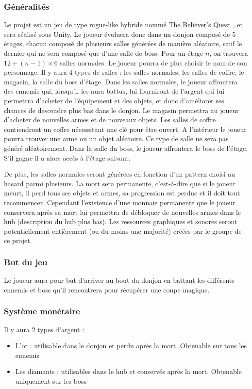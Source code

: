 \documentclass[]{extarticle}
\begin{document}
		\subsubsection{Généralités}
\bigbreak
\bigbreak
Le projet est un jeu de type rogue-like hybride nommé \og The Believer’s Quest \fg, et sera réalisé sous Unity. Le joueur évoluera donc dans un donjon composé de 5 étages, chacun composé de plusieurs salles générées de manière aléatoire, sauf le dernier qui ne sera composé que d’une salle de boss. Pour un étage $n$, on trouvera $12 + (n - 1) \times 6$ salles normales. Le joueur pourra de plus choisir le nom de son personnage.
\bigbreak
Il y aura 4 types de salles : les salles normales, les salles de coffre, le magasin, la salle du boss d’étage. Dans les salles normales, le joueur affrontera des ennemis qui, lorsqu’il les aura battus, lui fourniront de l’argent qui lui permettra d’acheter de l’équipement et des objets, et donc d’améliorer ses chances de descendre plus bas dans le donjon. Le magasin permettra au joueur d’acheter de nouvelles armes et de nouveaux objets. Les salles de coffre contiendront un coffre nécessitant une clé pour être ouvert. A l’intérieur le joueur pourra trouver une arme ou un objet aléatoire. Ce type de salle ne sera pas généré aléatoirement. Dans la salle du boss, le joueur affrontera le boss de l’étage. S’il gagne il a alors accès à l’étage suivant.

De plus, les salles normales seront générées en fonction d'un pattern choisi au hasard parmi plusieurs.
\bigbreak
La mort sera permanente, c’est-à-dire que si le joueur meurt, il perd tous ses objets et armes, sa progression est perdue et il doit tout recommencer. Cependant l’existence d’une monnaie permanente que le joueur conservera après sa mort lui permettra de débloquer de nouvelles armes dans le hub (description du hub plus bas).
\bigbreak
Les ressources graphiques et sonores seront potentiellement entièrement (ou du moins une majorité) créées par le groupe de ce projet. 
\bigbreak

		\subsubsection{But du jeu}
\bigbreak
\bigbreak
Le joueur aura pour but d’arriver au bout du donjon en battant les différents ennemis et boss qu’il rencontrera pour récupérer une coupe magique.
\bigbreak

		\subsubsection{Système monétaire}
\bigbreak
\bigbreak
Il y aura 2 types d’argent :
\begin{itemize}
\item L’or : utilisable dans le donjon et perdu après la mort. Obtenable sur tous les ennemis
\item Les diamants : utilisables dans le hub et conservés après la mort. Obtenable uniquement sur les boss
\end{itemize}
\bigbreak
\newpage
\end{document}
